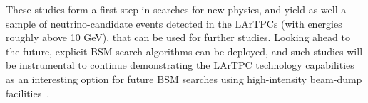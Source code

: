 These studies form a first step in searches for new physics, and yield as well a sample of neutrino-candidate events detected in the LArTPCs (with energies roughly above 10 GeV), that can be used for further studies. Looking ahead to the future, explicit BSM search algorithms can be deployed, and such studies will be instrumental to continue demonstrating the LArTPC technology capabilities as an interesting option for future BSM searches using high-intensity beam-dump facilities~\cite{Ferrillo:2023hhg}.